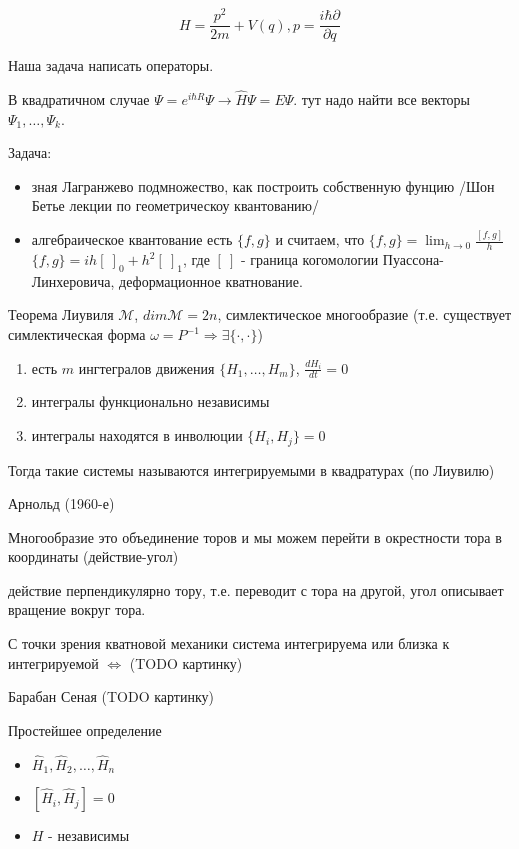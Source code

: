 $$H = \frac{p^2}{2m} + V(q), p = \frac{i\hbar \partial}{\partial q}$$

Наша задача написать операторы.

В квадратичном случае $\Psi=e^{i\hbar R}\Psi \rightarrow  \hat H \Psi = E \Psi$. тут надо 
найти все векторы $\Psi_1,\ldots,\Psi_k$.

Задача:
\begin{itemize}
    \item зная Лагранжево подмножество, как построить собственную фунцию /Шон Бетье лекции по геометрическоу квантованию/
    \item алгебраическое квантование
        есть $\{f,g\}$ и считаем, что $\{f,g\} = \lim_{h\rightarrow 0} \frac{[f,g]}{h}$ \\
        $\{f,g\} = i h [~]_0 + h^2 [~]_1$, где $[~]$ - граница когомологии Пуассона-Линхеровича, деформационное кватнование.
\end{itemize}


Теорема Лиувиля $\mathcal M$, $dim \mathcal M=2n$, симлектическое многообразие
(т.е. существует симлектическая форма $\omega = P^{-1} \Rightarrow \exists \{\cdot,\cdot\}$)
\begin{enumerate}
    \item есть $m$ ингтегралов движения $\{H_1,\ldots,H_m\}$, $\frac{dH_i}{dt}=0$
    \item интегралы функционально независимы
    \item интегралы находятся в инволюции $\{H_i,H_j\} = 0$
\end{enumerate} 
Тогда такие системы называются интегрируемыми в квадратурах (по Лиувилю)


Арнольд (1960-е)

Многообразие это объединение торов и мы можем перейти в окрестности тора в координаты (действие-угол)

действие перпендикулярно тору, т.е. переводит с тора на другой, угол описывает вращение вокруг тора.

С точки зрения кватновой механики система интегрируема или близка к интегрируемой $\Leftrightarrow$
(TODO картинку)

Барабан Сеная (TODO картинку)

Простейшее определение

\begin{itemize}
  \item $\hat H_1, \hat H_2,\ldots, \hat H_n$
  \item $[\hat H_i, \hat H_j] = 0$
  \item $H$ - независимы
\end{itemize}

